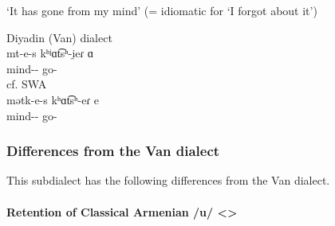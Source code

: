 \begin{table}[H]
	\centering
	\caption{Ablative suffixs in the Diyadin subdialect of the Van dialect}
	\label{tab:Van:subdialect:diyadin:same:abl}
\end{table} 

\begin{exe}
	\ex `It has gone from my mind' (= idiomatic for `I forgot about it') \label{sent:Van:subdialect:diyadin:same:abl}
	\begin{xlist}
		\ex Diyadin (Van) dialect \\ \gll mt-e-s kʰʲɑt͡sʰ-i̯eɾ ɑ \\
		mind-{\abl}-{\possFsg} go-{\perfcvb} {\aux} \\
		\trans {} 
		\ex cf. SWA  \\ \gll mətk-e-s kʰɑt͡sʰ-eɾ e \\
		mind-{\abl}-{\possFsg} go-{\eptcp} {\aux} \\
		\trans {}
	\end{xlist}
\end{exe}

\subsubsection{Differences from the Van dialect}
This subdialect has the following differences from the Van dialect. 


\paragraph{Retention of Classical Armenian /u/ <>} 



